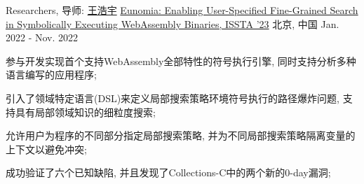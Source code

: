 \begin{cventries}
\cventry
    {Researchers, 导师: \href{https://howiepku.github.io/index.html}{王浩宇}} %
    {\href{https://dl.acm.org/doi/10.1145/3597926.3598064}{Eunomia: Enabling User-Specified Fine-Grained Search in Symbolically Executing WebAssembly Binaries, ISSTA '23}} %
    {北京, 中国} %
    {Jan. 2022 - Nov. 2022} %
    {
	\begin{cvitems} %
        \item {参与开发实现首个支持WebAssembly全部特性的符号执行引擎, 同时支持分析多种语言编写的应用程序;} 
        \item {引入了领域特定语言(DSL)来定义局部搜索策略环境符号执行的路径爆炸问题, 支持具有局部领域知识的细粒度搜索;}
        \item {允许用户为程序的不同部分指定局部搜索策略, 并为不同局部搜索策略隔离变量的上下文以避免冲突;}
        \item {成功验证了六个已知缺陷, 并且发现了Collections-C中的两个新的0-day漏洞;}
      \end{cvitems}
    }

\end{cventries}
